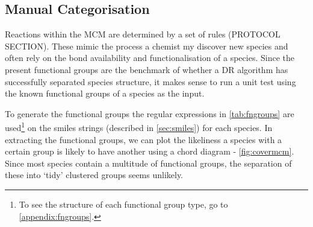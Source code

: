 \subsection{Manual Categorisation}
Reactions within the MCM are determined by a set of rules (PROTOCOL SECTION). These mimic the process a chemist my discover new species and often rely on the bond availability and functionalisation of a species. Since the present functional groups are the benchmark of whether a DR algorithm has successfully separated species structure, it makes sense to run a unit test using the known functional groups of a species as the input. 

To generate the functional groups the regular expressions in \autoref{tab:fngroups} are used\footnote{To see the structure of each functional group type, go to \autoref{appendix:fngroups}.} on the smiles strings (described in \autoref{sec:smiles}) for each species. In extracting the functional groups, we can plot the likeliness a species with a certain group is likely to have another using a chord diagram - \autoref{fig:covermcm}. Since most species contain a multitude of functional groups, the separation of these into `tidy' clustered groups seems unlikely.      


%



